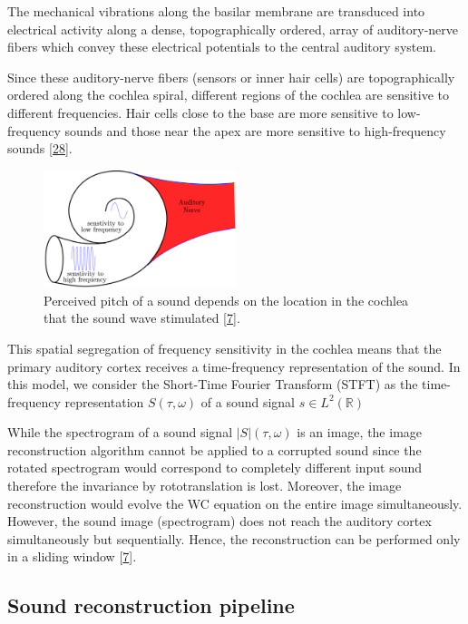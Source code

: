 \documentclass[
  american,
]{article}
\begin{document}
The mechanical vibrations along the basilar membrane are transduced into electrical activity
along a dense, topographically ordered, array of auditory-nerve fibers
which convey these electrical potentials to the central auditory system.

Since these auditory-nerve fibers (sensors or inner hair cells) are topographically ordered
along the cochlea spiral, different regions of the cochlea are sensitive to different frequencies.
Hair cells close to the base are more sensitive to low-frequency sounds and those near the apex
are more sensitive to high-frequency sounds {[}\protect\hyperlink{ref-yang1992}{28}{]}.

\begin{figure}
\centering
\includegraphics[width=0.5\textwidth,height=\textheight]{img/cochlea.png}
\caption{Perceived pitch of a sound depends on the location in the cochlea that the sound wave stimulated {[}\protect\hyperlink{ref-boscain2021}{7}{]}.}
\end{figure}

This spatial segregation of frequency sensitivity in the cochlea
means that the primary auditory cortex receives a time-frequency representation of the sound.
In this model, we consider the Short-Time Fourier Transform (STFT)
as the time-frequency representation \(S(\tau,\omega)\) of a sound signal \(s\in L^2(\mathbb{R})\)

While the spectrogram of a sound signal \(\left\lvert S\right\rvert(\tau,\omega)\) is an image,
the image reconstruction algorithm cannot be applied to a corrupted sound
since the rotated spectrogram would correspond to completely different input sound
therefore the invariance by rototranslation is lost.
Moreover, the image reconstruction would evolve the WC equation on the entire
image simultaneously. However, the sound image (spectrogram) does not reach
the auditory cortex simultaneously but sequentially.
Hence, the reconstruction can be performed only in a sliding window {[}\protect\hyperlink{ref-boscain2021}{7}{]}.

\hypertarget{sound-reconstruction-pipeline}{%
\subsection{Sound reconstruction pipeline}\label{sound-reconstruction-pipeline}}
\end{document}
